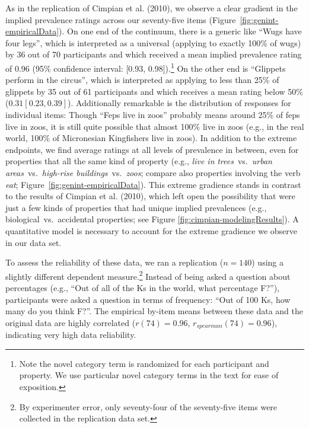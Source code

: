 \documentclass[floatsintext,doc]{apa6}
\let\rmarkdownfootnote\footnote%
\def\footnote{\protect\rmarkdownfootnote}
\newcommand{\ndg}[1]{{\textcolor{Green}{[ndg: #1]}}}
\begin{document}
As in the replication of Cimpian et al. (2010), we observe a clear gradient in the implied prevalence ratings across our seventy-five items (Figure~\ref{fig:genint-empiricalData}).
On one end of the continuum, there is a generic like \enquote{Wugs have four legs}, which is interpreted as a universal (applying to exactly 100\% of wugs) by 36 out of 70 participants and which received a mean implied prevalence rating of 0.96 (95\% confidence interval: [0.93, 0.98]).\footnote{Note the novel category term is randomized for each participant and property.
  We use particular novel category terms in the text for ease of exposition.}
On the other end is \enquote{Glippets perform in the circus}, which is interpreted as applying to less than 25\% of glippets by 35 out of 61 participants and which receives a mean rating below 50\% (\(0.31 [0.23, 0.39]\)).
Additionally remarkable is the distribution of responses for individual items: Though \enquote{Feps live in zoos} probably means around 25\% of feps live in zoos, it is still quite possible that almost 100\% live in zoos (e.g., in the real world, 100\% of Micronesian Kingfishers live in zoos).
In addition to the extreme endpoints, we find average ratings at all levels of prevalence in between, even for properties that all the same kind of property (e.g., \emph{live in} \emph{trees}~vs.~\emph{urban areas}~vs.~\emph{high-rise buildings}~vs.~\emph{zoos}; compare also properties involving the verb \emph{eat}; Figure~\ref{fig:genint-empiricalData}).
This extreme gradience stands in contrast to the results of Cimpian et al. (2010), which left open the possibility that were just a few kinds of properties that had unique implied prevalences (e.g., biological~vs.~accidental properties; see Figure \ref{fig:cimpian-modelingResults}). 
A quantitative model is necessary to account for the extreme gradience we observe in our data set.


To assess the reliability of these data, we ran a replication (\(n=140\)) using a slightly different dependent measure.\footnote{By experimenter error, only seventy-four of the seventy-five items were collected in the replication data set.}
Instead of being asked a question about percentages (e.g., \enquote{Out of all of the Ks in the world, what percentage F?}), participants were asked a question in terms of frequency: \enquote{Out of 100 Ks, how many do you think F?}.
The empirical by-item means between these data and the original data are highly correlated (\(r(74) = 0.96\), \(r_{spearman}(74)= 0.96\)), indicating very high data reliability.
\end{document}
